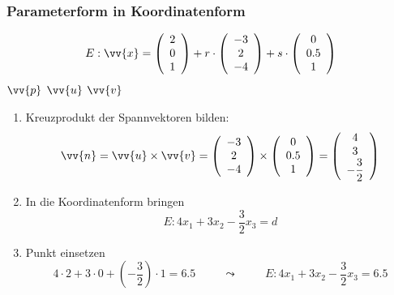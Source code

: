 \documentclass[a4paper, 15pt]{article}
\begin{document}
\subsubsection{Parameterform in Koordinatenform}
\begin{equation*}
E:\vv{x}=\left(\begin{array}{c} 2 \\ 0 \\ 1 \end{array}\right) + r \cdot \left(\begin{array}{c} -3 \\ 2 \\ -4 \end{array}\right) + s \cdot \left(\begin{array}{c} 0 \\ 0.5 \\ 1 \end{array}\right)
\end{equation*}
\hspace{6.95cm} $\vv{p}$ \hspace{1.3cm} $\vv{u}$ \hspace{1.4cm} $\vv{v}$
\begin{enumerate}
\item Kreuzprodukt der Spannvektoren bilden:
\begin{equation*}
\vv{n} = \vv{u} \times \vv{v} = \left(\begin{array}{c} -3 \\ 2 \\ -4 \end{array}\right) \times \left(\begin{array}{c} 0 \\ 0.5 \\ 1 \end{array}\right) = \left(\begin{array}{c} 4 \\ 3 \\ -\dfrac{3}{2} \end{array}\right)
\end{equation*}
\item In die Koordinatenform bringen
\begin{equation*}
E: 4x_1 + 3x_2 - \dfrac{3}{2}x_3 = d
\end{equation*}
\item Punkt einsetzen
\begin{equation*}
4\cdot2+3\cdot0+(-\dfrac{3}{2})\cdot1 = 6.5 \hspace{1cm}\leadsto\hspace{1cm} E: 4x_1+3x_2-\dfrac{3}{2}x_3 = 6.5
\end{equation*}
\end{enumerate}
\end{document}
